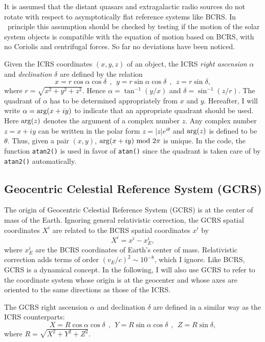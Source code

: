 \documentclass[12pt]{article}
\newcommand \beq {\begin{equation}}
\newcommand \eeq {\end{equation}}
\begin{document}
It is assumed that the distant quasars and extragalactic radio sources do not 
rotate with respect to asymptotically flat reference systems like BCRS. In \
principle this assumption should be checked by testing if the motion of 
the solar system objects is compatible with the equation of motion based 
on BCRS, with no Coriolis and centrifugal forces. So far no deviations have been 
noticed. 

Given the ICRS coordinates $(x,y,z)$ of an object, the ICRS {\em right ascension} 
$\alpha$ and {\em declination} $\delta$ are defined by the relation 
\beq
  x = r \cos \alpha \cos \delta \ \ , \ \ 
  y = r \sin \alpha \cos \delta \ \ , \ \
  z = r \sin \delta ,
\eeq
where $r=\sqrt{x^2+y^2+z^2}$. Hence $\alpha = \tan^{-1} (y/x)$ and 
$\delta = \sin^{-1}(z/r)$. The quadrant of $\alpha$ has to be determined
appropriately from $x$ and $y$. Hereafter, I will write $\alpha = {\rm arg}(x+iy)$ 
to indicate that an appropriate quadrant should be used. Here ${\rm arg}(z)$ denotes 
the argument of a complex number $z$. Any complex number $z=x+iy$ can be written in 
the polar form $z=|z| e^{i\theta}$ and ${\rm arg}(z)$ is defined to be $\theta$. 
Thus, given a pair $(x,y)$, ${\rm arg}(x+iy)~{\rm mod}~2\pi$ is unique.
In the code, the function {\tt atan2()} is used in favor of {\tt atan()} 
since the quadrant is taken care of by {\tt atan2()} automatically.

\subsection{Geocentric Celestial Reference System (GCRS)}

The origin of Geocentric Celestial Reference System (GCRS) is at the 
center of mass of the Earth. 
Ignoring general relativistic correction, the GCRS spatial coordinates $X^i$ 
are related to the BCRS spatial coordinates $x^i$ by 
\beq
  X^i = x^i - x^i_E ,
\label{eq:GCRSX}
\eeq
where $x^i_E$ are the BCRS coordinates of Earth's center of mass. Relativistic 
correction adds terms of order $(v_E/c)^2 \sim 10^{-8}$, which I ignore. Like 
BCRS, GCRS is a dynamical concept. In the following, I will also use GCRS 
to refer to the coordinate system whose origin is at the geocenter and whose 
axes are oriented to the same directions as those of the ICRS.

The GCRS right ascension $\alpha$ and declination $\delta$ are defined in a
similar way as the ICRS counterparts:
\beq
  X = R \cos \alpha \cos \delta \ \ , \ \
  Y = R \sin \alpha \cos \delta \ \ , \ \
  Z = R \sin \delta ,
\label{eq:GCRScoord}
\eeq
where $R=\sqrt{X^2+Y^2+Z^2}$.
\end{document}
